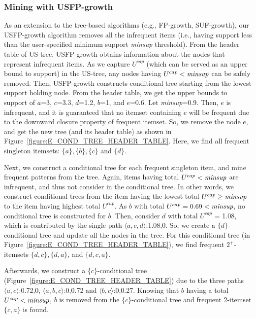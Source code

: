 \documentclass[10pt, conference, compsocconf]{IEEEtran}
\begin{document}
\subsubsection{Mining with USFP-growth}\label{sec:USFP}

As an extension to the tree-based algorithms (e.g., FP-growth, SUF-growth), our USFP-growth algorithm removes all the infrequent items (i.e., having support less than the user-specified minimum support {\it minsup} threshold). From the header table of \mbox{US-tree}, USFP-growth obtains information about the nodes that represent infrequent items. As we capture $U^{cap}$ (which can be served as an upper bound to support) in the US-tree, any nodes having $U^{cap} < {\it minsup}$ can be safely removed.
Then, USFP-growth constructs conditional tree starting from the lowest support holding node.
From the header table, we get the upper bounds to support of $a$=3, $c$=3.3, $d$=1.2, $b$=1, and $e$=0.6. Let {\it minsup}=0.9. Then, $e$ is infrequent, and it is guaranteed that no itemset containing $e$ will be frequent due to the downward closure property of frequent itemset. So, we remove the node $e$, and get the new tree (and its header table) as shown in Figure~\ref{figure:E_COND_TREE_HEADER_TABLE}. Here, we find all frequent singleton itemsets: $\{a\}, \{b\}, \{c\}$ and $\{d\}$. 

Next, we construct a conditional tree for each frequent singleton item, and mine frequent patterns from the tree. Again, items having total $U^{cap} < {\it minsup}$ are infrequent, and thus not consider in the conditional tree. In other words, we construct conditional trees from the item having the lowest total $U^{cap} \geq {\it minsup}$ to the item having highest total $U^{cap}$.
As $b$ with total $U^{cap} = 0.69 < {\it minsup}$, no conditional tree is constructed for $b$. Then, consider $d$ with total $U^{cap}$ = 1.08, which is contributed by the single path $\langle a, c, d\rangle$:1.08,0.
So, we create a $\{d\}$-conditional tree and update all the nodes in the tree. 
For this conditional tree (in Figure~\ref{figure:E_COND_TREE_HEADER_TABLE}), we find frequent $2^+$-itemsets $\{d,c\}, \{d,a\}$, and $\{d,c,a\}$.

Afterwards, we construct a $\{c\}$-conditional tree (Figure~\ref{figure:E_COND_TREE_HEADER_TABLE}) due to the three paths $\langle a,c\rangle$:0.72,0, $\langle a,b,c\rangle$:0,0.72 and $\langle b,c\rangle$:0,0.27. 
Knowing that $b$ having a total $U^{cap} < {\it minsup}$, $b$ is removed from the $\{c\}$-conditional tree and frequent \mbox{2-itemset} $\{c,a\}$ is found. 
\end{document}
